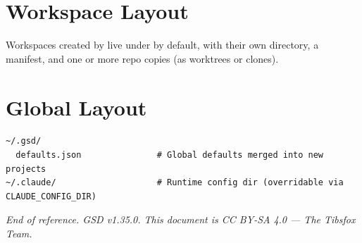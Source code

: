 \documentclass[10pt,letterpaper]{article}
\begin{document}
\section*{Workspace Layout}

Workspaces created by  live under  by default, with their own  directory, a  manifest, and one or more repo copies (as worktrees or clones).

\section*{Global Layout}

\begin{lstlisting}
~/.gsd/
  defaults.json               # Global defaults merged into new projects
~/.claude/                    # Runtime config dir (overridable via CLAUDE_CONFIG_DIR)
\end{lstlisting}

\vspace{1em}
\begin{center}
\small\textit{End of reference. GSD v1.35.0. This document is CC BY-SA 4.0 — The Tibsfox Team.}
\end{center}
\end{document}
